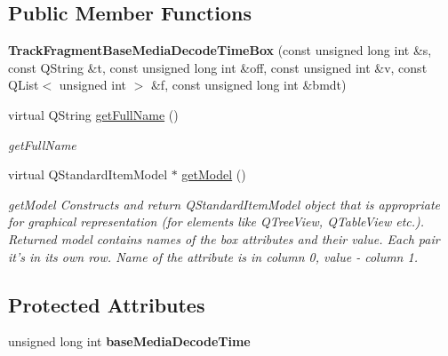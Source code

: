 \subsection*{Public Member Functions}
\begin{DoxyCompactItemize}
\item 
\hypertarget{class_track_fragment_base_media_decode_time_box_ab02712ab21760a494762cefa7bdb8535}{{\bfseries Track\-Fragment\-Base\-Media\-Decode\-Time\-Box} (const unsigned long int \&s, const Q\-String \&t, const unsigned long int \&off, const unsigned int \&v, const Q\-List$<$ unsigned int $>$ \&f, const unsigned long int \&bmdt)}\label{class_track_fragment_base_media_decode_time_box_ab02712ab21760a494762cefa7bdb8535}

\item 
virtual Q\-String \hyperlink{class_track_fragment_base_media_decode_time_box_acf81a553080878b3066b24fc00b14f9e}{get\-Full\-Name} ()
\begin{DoxyCompactList}\small\item\em get\-Full\-Name \end{DoxyCompactList}\item 
virtual Q\-Standard\-Item\-Model $\ast$ \hyperlink{class_track_fragment_base_media_decode_time_box_a6a0cf2982f9e9a8a8ba5adf6c18d6caf}{get\-Model} ()
\begin{DoxyCompactList}\small\item\em get\-Model Constructs and return Q\-Standard\-Item\-Model object that is appropriate for graphical representation (for elements like Q\-Tree\-View, Q\-Table\-View etc.). Returned model contains names of the box attributes and their value. Each pair it's in its own row. Name of the attribute is in column 0, value -\/ column 1. \end{DoxyCompactList}\end{DoxyCompactItemize}
\subsection*{Protected Attributes}
\begin{DoxyCompactItemize}
\item 
\hypertarget{class_track_fragment_base_media_decode_time_box_af0f903b58c6feb4d3972611d9bee1c9f}{unsigned long int {\bfseries base\-Media\-Decode\-Time}}\label{class_track_fragment_base_media_decode_time_box_af0f903b58c6feb4d3972611d9bee1c9f}

\end{DoxyCompactItemize}


